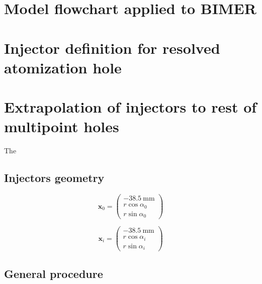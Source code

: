 \section{Model flowchart applied to BIMER}
\label{sec:ch9_BIMER_SLI_flowchart}

\section{Injector definition for resolved atomization hole}

\section{Extrapolation of injectors to rest of multipoint holes}

The 

\subsection{Injectors geometry}

\begin{equation}
\boldsymbol{x}_0 =  \begin{pmatrix} - 38.5 ~\mathrm{mm} \\ r \cos \alpha_0 \\ r \sin \alpha_0 \end{pmatrix}
\end{equation}

\begin{equation}
\boldsymbol{x}_i =  \begin{pmatrix} - 38.5 ~\mathrm{mm} \\ r \cos \alpha_i \\ r \sin \alpha_i \end{pmatrix}
\end{equation}


\subsection{General procedure}

